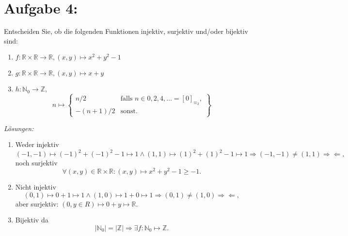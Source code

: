 \documentclass{exam}
\begin{document}
\pagebreak

\section*{Aufgabe 4:}
Entscheiden Sie, ob die folgenden Funktionen injektiv, surjektiv und/oder bijektiv sind:
\begin{enumerate}[label=\roman*)]
    \item $f: \mathbb{R} \times \mathbb{R} \rightarrow \mathbb{R}, (x,y) \mapsto x^2 + y^2 -1$
    \item $g: \mathbb{R} \times \mathbb{R} \rightarrow \mathbb{R}, (x,y) \mapsto x + y$
    \item $h: \mathbb{N}_0 \rightarrow \mathbb{Z}$, \[
              n \mapsto \left\{
              \begin{array}{ll}
                  n/2      & \text{falls } n \in {0,2,4, \dots} = [0]_{\equiv_2}, \\
                  -(n+1)/2 & \text{sonst}.
              \end{array}
              \right\}
          \]
\end{enumerate}
\textit{Lösungen:}
\begin{enumerate}[label=\roman*)]
    \item Weder injektiv
          \[
              (-1,-1) \mapsto {(-1)}^2 + {(-1)}^2 - 1 \mapsto 1
              \land
              (1,1) \mapsto {(1)}^2 + {(1)}^2 - 1 \mapsto 1
              \Rightarrow
              (-1,-1) \not = (1,1)
              \Rightarrow\Leftarrow,
          \] noch surjektiv \[
              \forall (x,y) \in \mathbb{R} \times \mathbb{R}: (x,y) \mapsto x^2 + y^2 -1 \ge -1.
          \]
    \item Nicht injektiv
          \[
              (0,1) \mapsto 0 + 1 \mapsto 1
              \land
              (1,0) \mapsto 1 + 0 \mapsto 1
              \Rightarrow
              (0,1) \not = (1,0)
              \Rightarrow\Leftarrow,
          \] aber surjektiv: $(0, y \in R) \mapsto 0 + y \mapsto \mathbb{R}$.
    \item Bijektiv da
          \[
              \lvert \mathbb{N}_0 \lvert = \lvert \mathbb{Z} \lvert \Rightarrow \exists f: \mathbb{N}_0 \mapsto \mathbb{Z}.
          \]
\end{enumerate}
\end{document}

